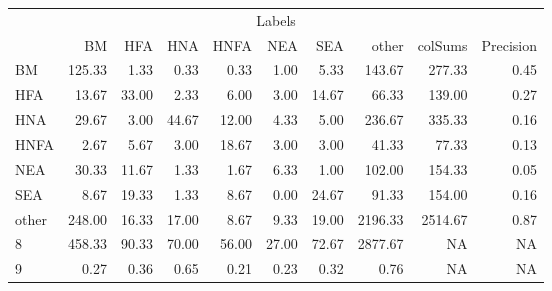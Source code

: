 \begin{table}
\centering\begingroup\fontsize{11}{13}\selectfont

\begin{tabular}{lrrrrrr>{}r|rr}
\toprule
\multicolumn{10}{c}{Labels} \\
\cmidrule(l{3pt}r{3pt}){1-10}
  & BM & HFA & HNA & HNFA & NEA & SEA & other & colSums & Precision\\
\midrule
BM & 125.33 & 1.33 & 0.33 & 0.33 & 1.00 & 5.33 & 143.67 & 277.33 & 0.45\\
HFA & 13.67 & 33.00 & 2.33 & 6.00 & 3.00 & 14.67 & 66.33 & 139.00 & 0.27\\
HNA & 29.67 & 3.00 & 44.67 & 12.00 & 4.33 & 5.00 & 236.67 & 335.33 & 0.16\\
HNFA & 2.67 & 5.67 & 3.00 & 18.67 & 3.00 & 3.00 & 41.33 & 77.33 & 0.13\\
NEA & 30.33 & 11.67 & 1.33 & 1.67 & 6.33 & 1.00 & 102.00 & 154.33 & 0.05\\
\addlinespace
SEA & 8.67 & 19.33 & 1.33 & 8.67 & 0.00 & 24.67 & 91.33 & 154.00 & 0.16\\
other & 248.00 & 16.33 & 17.00 & 8.67 & 9.33 & 19.00 & 2196.33 & 2514.67 & 0.87\\
8 & 458.33 & 90.33 & 70.00 & 56.00 & 27.00 & 72.67 & 2877.67 & NA & NA\\
9 & 0.27 & 0.36 & 0.65 & 0.21 & 0.23 & 0.32 & 0.76 & NA & NA\\
\bottomrule
\end{tabular}
\endgroup{}
\end{table}
